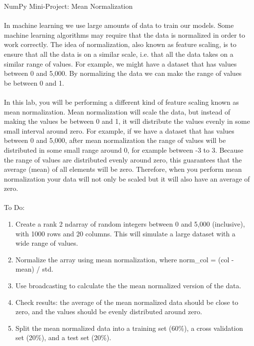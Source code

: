 NumPy Mini-Project: Mean Normalization
\\\\

In machine learning we use large amounts of data to train our models. Some machine learning algorithms may require that the data is normalized in order to work correctly. The idea of normalization, also known as feature scaling, is to ensure that all the data is on a similar scale, i.e. that all the data takes on a similar range of values. For example, we might have a dataset that has values between 0 and 5,000. By normalizing the data we can make the range of values be between 0 and 1.
\\\\

In this lab, you will be performing a different kind of feature scaling known as mean normalization. Mean normalization will scale the data, but instead of making the values be between 0 and 1, it will distribute the values evenly in some small interval around zero. For example, if we have a dataset that has values between 0 and 5,000, after mean normalization the range of values will be distributed in some small range around 0, for example between -3 to 3. Because the range of values are distributed evenly around zero, this guarantees that the average (mean) of all elements will be zero. Therefore, when you perform mean normalization your data will not only be scaled but it will also have an average of zero.
\\\\

To Do:
\begin{enumerate}
	\item Create a rank 2 ndarray of random integers between 0 and 5,000 (inclusive), with 1000 rows and 20 columns. This will simulate a large dataset with a wide range of values.
	\item Normalize the array using mean normalization, where norm\_col = (col - mean) / std.
	\item Use broadcasting to calculate the the mean normalized version of the data.
	\item Check results: the average of the mean normalized data should be close to zero, and the values should be evenly distributed around zero.
	\item Split the mean normalized data into a training set (60\%), a cross validation set (20\%), and a test set (20\%).
\end{enumerate}

